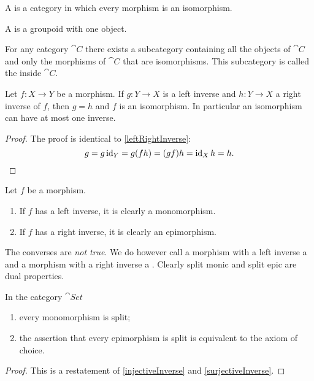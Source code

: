 \begin{definition}
A  is a category in which every morphism is an isomorphism.

A  is a groupoid with one object.
\end{definition}

\begin{lemma}
For any category $\cat{C}$ there exists a subcategory containing all the objects of $\cat{C}$ and only the morphisms of $\cat{C}$ that are isomorphisms. This subcategory is called the  inside $\cat{C}$.
\end{lemma}

\begin{lemma}
Let $f:X\to Y$ be a morphism. If $g: Y\to X$ is a left inverse and $h: Y\to X$ a right inverse of $f$, then $g=h$ and $f$ is an isomorphism. In particular an isomorphism can have at most one inverse.
\end{lemma}
\begin{proof}
The proof is identical to \ref{leftRightInverse}:
\[ g = g\operatorname{id}_Y = g(fh) = (gf)h = \operatorname{id}_Xh = h. \]
\end{proof}

\begin{lemma}
Let $f$ be a morphism.
\begin{enumerate}
\item If $f$ has a left inverse, it is clearly a monomorphism.
\item If $f$ has a right inverse, it is clearly an epimorphism.
\end{enumerate}
\end{lemma} 
The converses are \emph{not true}. We do however call a morphism with a left inverse a  and a morphism with a right inverse a . Clearly split monic and split epic are dual properties.

\begin{lemma}
In the category $\cat{Set}$
\begin{enumerate}
\item every monomorphism is split;
\item the assertion that every epimorphism is split is equivalent to the axiom of choice.
\end{enumerate}
\end{lemma}
\begin{proof}
This is a restatement of \ref{injectiveInverse} and \ref{surjectiveInverse}.
\end{proof}

